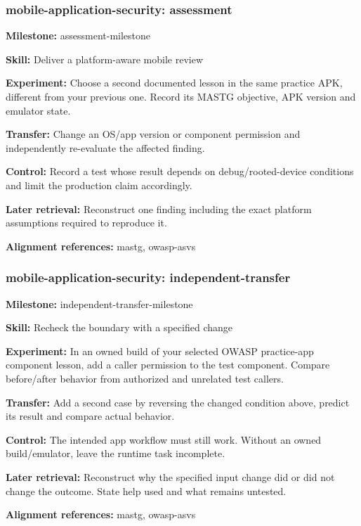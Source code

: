 \subsubsection{mobile-application-security: assessment}
\noindent\textbf{Milestone:} assessment-milestone\par
\noindent\textbf{Skill:} Deliver a platform-aware mobile review\par
\noindent\textbf{Experiment:} Choose a second documented lesson in the same practice APK, different from your previous one. Record its MASTG objective, APK version and emulator state.\par
\noindent\textbf{Transfer:} Change an OS/app version or component permission and independently re-evaluate the affected finding.\par
\noindent\textbf{Control:} Record a test whose result depends on debug/rooted-device conditions and limit the production claim accordingly.\par
\noindent\textbf{Later retrieval:} Reconstruct one finding including the exact platform assumptions required to reproduce it.\par
\noindent\textbf{Alignment references:} mastg, owasp-asvs\par
\subsubsection{mobile-application-security: independent-transfer}
\noindent\textbf{Milestone:} independent-transfer-milestone\par
\noindent\textbf{Skill:} Recheck the boundary with a specified change\par
\noindent\textbf{Experiment:} In an owned build of your selected OWASP practice-app component lesson, add a caller permission to the test component. Compare before/after behavior from authorized and unrelated test callers.\par
\noindent\textbf{Transfer:} Add a second case by reversing the changed condition above, predict its result and compare actual behavior.\par
\noindent\textbf{Control:} The intended app workflow must still work. Without an owned build/emulator, leave the runtime task incomplete.\par
\noindent\textbf{Later retrieval:} Reconstruct why the specified input change did or did not change the outcome. State help used and what remains untested.\par
\noindent\textbf{Alignment references:} mastg, owasp-asvs\par
